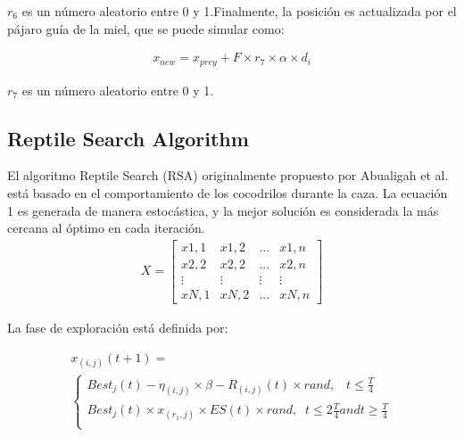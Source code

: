 \documentclass[conference]{IEEEtran}
\begin{document}
\noindent $r_6$ es un número aleatorio entre 0 y 1.Finalmente, la posición es actualizada por el pájaro guía de la miel, que se puede simular como:

\begin{equation}
	\begin{gathered}
		x_{new}=x_{prey}+F\times r_7\times \alpha \times d_i
	\end{gathered}
	\label{eq32}
\end{equation}

\noindent $r_7$ es un número aleatorio entre 0 y 1.

\subsection{Reptile Search Algorithm}

\noindent El algoritmo Reptile Search (RSA) originalmente propuesto por Abualigah et al.~\cite{Abualigah2022} está basado en el comportamiento de los cocodrilos durante la caza. 
\noindent La ecuación 1 es generada de manera estocástica, y la mejor solución es considerada la más cercana al óptimo en cada iteración.
\begin{equation}
	\begin{gathered}
		X= \begin{bmatrix}
			x1,1 & x1,2 & ... & x1,n  \\
			x2,2 & x2,2 & ... & x2,n  \\
			\vdots & \vdots & \vdots & \vdots \\
			xN,1 & xN,2 & ... & xN,n
		\end{bmatrix}
	\end{gathered}
	\label{eq33}
\end{equation}

\noindent La fase de exploración está definida por:

\begin{equation}
	\begin{gathered}
		x_{(i,j)}(t+1)=\\
		\begin{cases}
			Best_j (t) - \eta_{(i,j)}\times \beta-R_{(i,j)}(t)\times rand, \; \; \; t \leq \frac{T}{4}               \\
			Best_j (t) \times x_{(r_1,j)} \times ES(t) \times rand, \; \; t \leq 2\frac{T}{4} and t \geq \frac{T}{4} \\
		\end{cases}
	\end{gathered}
	\label{eq34}
\end{equation}   
\end{document}
